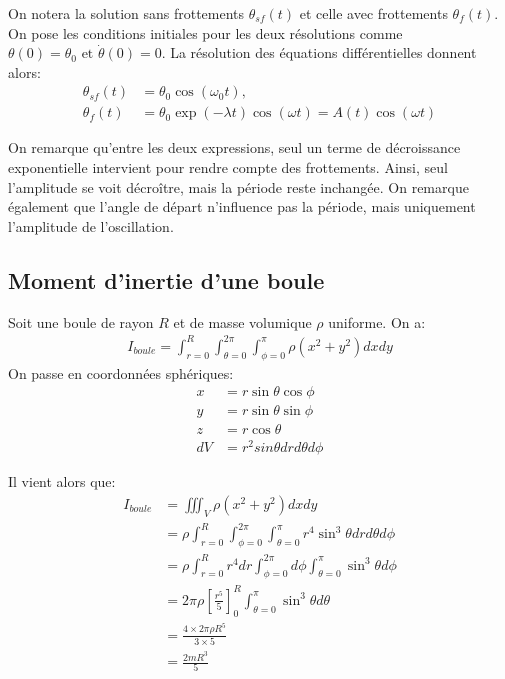 \documentclass[12pt]{article}
\begin{document}
On notera la solution sans frottements $\theta_{sf}(t)$ et celle avec frottements $\theta_{f}(t)$. On pose
les conditions initiales pour les deux résolutions comme $\theta(0) = \theta_0 \text{ et } \dot \theta(0) = 0$. La résolution des équations 
différentielles donnent alors:
\begin{align}
    \theta_{sf}(t) &= \theta_0 \cos(\omega_0 t), \quad  \\
    \theta_{f}(t) &= \theta_0 \exp(-\lambda t)\cos(\omega t) = A(t) \cos(\omega t)
\end{align}

On remarque qu'entre les deux expressions, seul un terme de décroissance exponentielle intervient pour rendre compte des frottements.
Ainsi, seul l'amplitude se voit décroître, mais la période reste inchangée.
On remarque également que l'angle de départ n'influence pas la période, mais uniquement l'amplitude de l'oscillation.

\subsection{Moment d'inertie d'une boule}
\label{boule}
Soit une boule de rayon $R$ et de masse volumique $\rho$ uniforme. On a:
\begin{align}
    I_{boule} = \int_{r=0}^{R}\int_{\theta=0}^{2\pi}\int_{\phi=0}^{\pi} \rho (x^2 + y^2) dxdy
\end{align}
On passe en coordonnées sphériques:
\begin{align*}
    x &= r \sin \theta \cos \phi \\
    y &= r \sin \theta \sin \phi \\
    z &= r \cos \theta \\
    dV &= r^2 sin \theta dr d\theta d\phi
\end{align*}

\break
Il vient alors que:
\begin{align*}
    I_{boule} & = \iiint_V \rho (x^2 + y^2) dxdy \\
    & = \rho \int_{r=0}^{R}\int_{\phi=0}^{2\pi}\int_{\theta=0}^{\pi} r^4 \sin^3 \theta dr d\theta d\phi \\
    & = \rho \int_{r=0}^{R} r^4 dr \int_{\phi=0}^{2\pi} d\phi \int_{\theta=0}^{\pi} \sin^3 \theta d\phi \\
    & = 2\pi \rho \left[ \frac{r^5}{5} \right]_0^R \int_{\theta=0}^{\pi} \sin^3 \theta d\theta \\
    & = \frac{4 \times 2 \pi \rho R^5}{3 \times 5 } \\
    & = \frac{2 m R^3}{5}
\end{align*}
\end{document}
